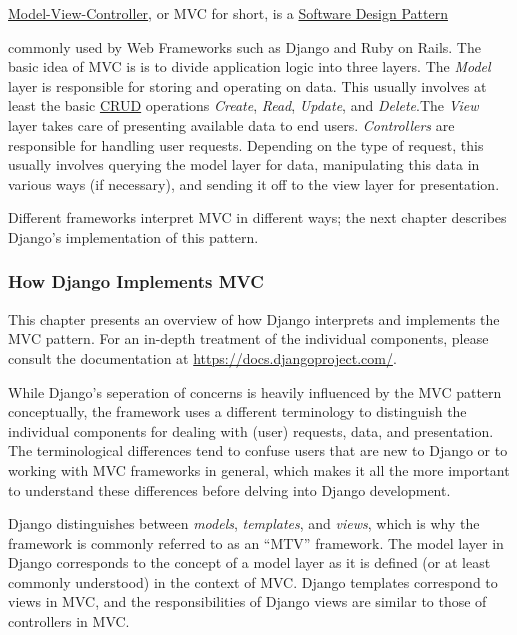 \href{https://en.wikipedia.org/wiki/Model_view_controller}{Model-View-Controller},
or MVC for short, is a
\href{https://en.wikipedia.org/wiki/Software_design_pattern}{Software Design Pattern}

commonly used by Web Frameworks such as Django and Ruby on Rails. The
basic idea of MVC is is to divide application logic into three layers.
The \emph{Model} layer is responsible for storing and operating on
data. This usually involves at least the basic
\href{https://en.wikipedia.org/wiki/CRUD}{CRUD} operations
\emph{Create}, \emph{Read}, \emph{Update}, and \emph{Delete}.The
\emph{View} layer takes care of presenting available data to end
users. \emph{Controllers} are responsible for handling user requests.
Depending on the type of request, this usually involves querying the
model layer for data, manipulating this data in various ways (if
necessary), and sending it off to the view layer for presentation.

Different frameworks interpret MVC in different ways; the next chapter
describes Django's implementation of this pattern.

\subsubsection{How Django Implements MVC}
\label{sec:django-mvc}

This chapter presents an overview of how Django interprets and
implements the MVC pattern. For an in-depth treatment of the
individual components, please consult the documentation at
\url{https://docs.djangoproject.com/}.

While Django's seperation of concerns is heavily influenced by the MVC
pattern conceptually, the framework uses a different terminology to
distinguish the individual components for dealing with (user)
requests, data, and presentation. The terminological differences tend
to confuse users that are new to Django or to working with MVC
frameworks in general, which makes it all the more important to
understand these differences before delving into Django development.

Django distinguishes between \emph{models}, \emph{templates}, and
\emph{views}, which is why the framework is commonly referred to as an
``MTV'' framework. The model layer in Django corresponds to the
concept of a model layer as it is defined (or at least commonly
understood) in the context of MVC. Django templates correspond to
views in MVC, and the responsibilities of Django views are similar to
those of controllers in MVC.


